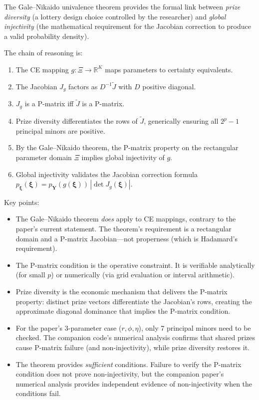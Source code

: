 \documentclass[11pt,a4paper]{article}
\theoremstyle{definition}
\newcommand{\R}{\mathbb{R}}
\newcommand{\bxi}{\boldsymbol{\xi}}
\begin{document}
\begin{keyresult}
The Gale--Nikaido univalence theorem provides the formal link between
\emph{prize diversity} (a lottery design choice controlled by the researcher)
and \emph{global injectivity} (the mathematical requirement for the Jacobian
correction to produce a valid probability density).

The chain of reasoning is:
\begin{enumerate}
    \item The CE mapping $g: \Xi \to \R^K$ maps parameters to certainty
    equivalents.
    \item The Jacobian $J_g$ factors as $D^{-1} \widetilde{J}$ with $D$
    positive diagonal.
    \item $J_g$ is a P-matrix iff $\widetilde{J}$ is a P-matrix.
    \item Prize diversity differentiates the rows of $\widetilde{J}$, generically
    ensuring all $2^p - 1$ principal minors are positive.
    \item By the Gale--Nikaido theorem, the P-matrix property on the rectangular
    parameter domain $\Xi$ implies global injectivity of $g$.
    \item Global injectivity validates the Jacobian correction formula
    $p_{\bxi}(\bxi) = p_{\mathbf{Y}}(g(\bxi)) \, |\det J_g(\bxi)|$.
\end{enumerate}
\end{keyresult}

\noindent
Key points:
\begin{itemize}
    \item The Gale--Nikaido theorem \emph{does} apply to CE mappings, contrary
    to the paper's current statement. The theorem's requirement is a rectangular
    domain and a P-matrix Jacobian---not properness (which is Hadamard's
    requirement).

    \item The P-matrix condition is the operative constraint. It is verifiable
    analytically (for small $p$) or numerically (via grid evaluation or interval
    arithmetic).

    \item Prize diversity is the economic mechanism that delivers the P-matrix
    property: distinct prize vectors differentiate the Jacobian's rows, creating
    the approximate diagonal dominance that implies the P-matrix condition.

    \item For the paper's 3-parameter case ($r, \phi, \eta$), only 7 principal
    minors need to be checked. The companion code's numerical analysis confirms
    that shared prizes cause P-matrix failure (and non-injectivity), while prize
    diversity restores it.

    \item The theorem provides \emph{sufficient} conditions. Failure to verify
    the P-matrix condition does not prove non-injectivity, but the companion
    paper's numerical analysis provides independent evidence of non-injectivity
    when the conditions fail.
\end{itemize}
\end{document}
